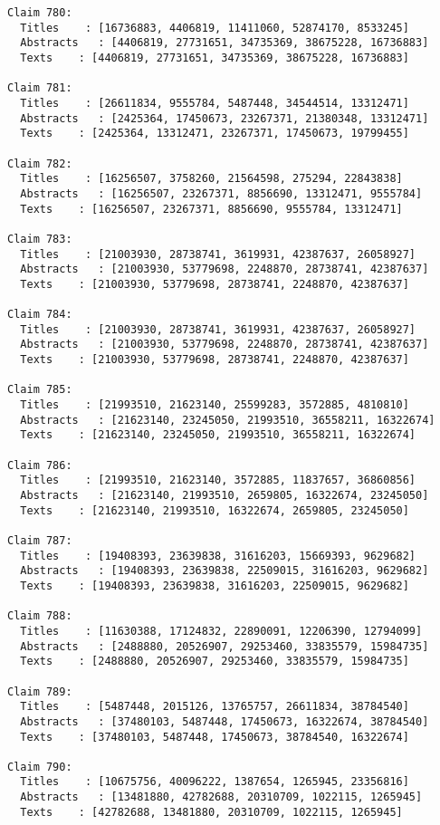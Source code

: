 \documentclass[11pt]{article}
\begin{document}
\begin{Verbatim}[commandchars=\\\{\}]
Claim 780:
  Titles    : [16736883, 4406819, 11411060, 52874170, 8533245]
  Abstracts   : [4406819, 27731651, 34735369, 38675228, 16736883]
  Texts    : [4406819, 27731651, 34735369, 38675228, 16736883]

Claim 781:
  Titles    : [26611834, 9555784, 5487448, 34544514, 13312471]
  Abstracts   : [2425364, 17450673, 23267371, 21380348, 13312471]
  Texts    : [2425364, 13312471, 23267371, 17450673, 19799455]

Claim 782:
  Titles    : [16256507, 3758260, 21564598, 275294, 22843838]
  Abstracts   : [16256507, 23267371, 8856690, 13312471, 9555784]
  Texts    : [16256507, 23267371, 8856690, 9555784, 13312471]

Claim 783:
  Titles    : [21003930, 28738741, 3619931, 42387637, 26058927]
  Abstracts   : [21003930, 53779698, 2248870, 28738741, 42387637]
  Texts    : [21003930, 53779698, 28738741, 2248870, 42387637]

Claim 784:
  Titles    : [21003930, 28738741, 3619931, 42387637, 26058927]
  Abstracts   : [21003930, 53779698, 2248870, 28738741, 42387637]
  Texts    : [21003930, 53779698, 28738741, 2248870, 42387637]

Claim 785:
  Titles    : [21993510, 21623140, 25599283, 3572885, 4810810]
  Abstracts   : [21623140, 23245050, 21993510, 36558211, 16322674]
  Texts    : [21623140, 23245050, 21993510, 36558211, 16322674]

Claim 786:
  Titles    : [21993510, 21623140, 3572885, 11837657, 36860856]
  Abstracts   : [21623140, 21993510, 2659805, 16322674, 23245050]
  Texts    : [21623140, 21993510, 16322674, 2659805, 23245050]

Claim 787:
  Titles    : [19408393, 23639838, 31616203, 15669393, 9629682]
  Abstracts   : [19408393, 23639838, 22509015, 31616203, 9629682]
  Texts    : [19408393, 23639838, 31616203, 22509015, 9629682]

Claim 788:
  Titles    : [11630388, 17124832, 22890091, 12206390, 12794099]
  Abstracts   : [2488880, 20526907, 29253460, 33835579, 15984735]
  Texts    : [2488880, 20526907, 29253460, 33835579, 15984735]

Claim 789:
  Titles    : [5487448, 2015126, 13765757, 26611834, 38784540]
  Abstracts   : [37480103, 5487448, 17450673, 16322674, 38784540]
  Texts    : [37480103, 5487448, 17450673, 38784540, 16322674]

Claim 790:
  Titles    : [10675756, 40096222, 1387654, 1265945, 23356816]
  Abstracts   : [13481880, 42782688, 20310709, 1022115, 1265945]
  Texts    : [42782688, 13481880, 20310709, 1022115, 1265945]


\end{Verbatim}
\end{document}
